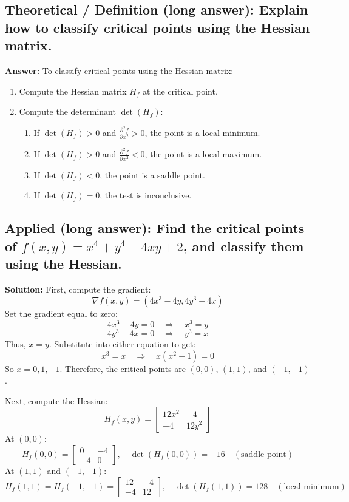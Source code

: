 \documentclass[12pt]{article}
\begin{document}
\subsection{Theoretical / Definition (long answer): Explain how to classify critical points using the Hessian matrix.}
\textbf{Answer:} To classify critical points using the Hessian matrix:
\begin{enumerate}
    \item  Compute the Hessian matrix \( H_f \) at the critical point.
    \item  Compute the determinant \( \det(H_f) \):
   \begin{enumerate}
       \item If \( \det(H_f) > 0 \) and \( \frac{\partial^2 f}{\partial x^2} > 0 \), the point is a local minimum.
        \item If \( \det(H_f) > 0 \) and \( \frac{\partial^2 f}{\partial x^2} < 0 \), the point is a local maximum.
        \item  If \( \det(H_f) < 0 \), the point is a saddle point.
    \item  If \( \det(H_f) = 0 \), the test is inconclusive.
   \end{enumerate} 
\end{enumerate}

\subsection{Applied (long answer): Find the critical points of \( f(x, y) = x^4 + y^4 - 4xy + 2 \), and classify them using the Hessian.}
\textbf{Solution:}
First, compute the gradient:
\[
\nabla f(x, y) = \left( 4x^3 - 4y, 4y^3 - 4x \right)
\]
Set the gradient equal to zero:
\[
4x^3 - 4y = 0 \quad \Rightarrow \quad x^3 = y
\]
\[
4y^3 - 4x = 0 \quad \Rightarrow \quad y^3 = x
\]
Thus, \( x = y \). Substitute into either equation to get:
\[
x^3 = x \quad \Rightarrow \quad x(x^2 - 1) = 0
\]
So \( x = 0, 1, -1 \). Therefore, the critical points are \( (0, 0) \), \( (1, 1) \), and \( (-1, -1) \).

Next, compute the Hessian:
\[
H_f(x, y) = \begin{bmatrix} 12x^2 & -4 \\ -4 & 12y^2 \end{bmatrix}
\]
At \( (0, 0) \):
\[
H_f(0, 0) = \begin{bmatrix} 0 & -4 \\ -4 & 0 \end{bmatrix}, \quad \det(H_f(0, 0)) = -16 \quad (\text{saddle point})
\]
At \( (1, 1) \) and \( (-1, -1) \):
\[
H_f(1, 1) = H_f(-1, -1) = \begin{bmatrix} 12 & -4 \\ -4 & 12 \end{bmatrix}, \quad \det(H_f(1, 1)) = 128 \quad (\text{local minimum})
\]
\end{document}
